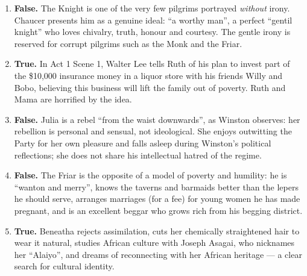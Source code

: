 \documentclass[11pt]{article}
\begin{document}
\begin{corrige}
\begin{enumerate}
\item \textbf{False.} The Knight is one of the very few pilgrims portrayed \emph{without} irony. Chaucer presents him as a genuine ideal: ``a worthy man'', a perfect ``gentil knight'' who loves chivalry, truth, honour and courtesy. The gentle irony is reserved for corrupt pilgrims such as the Monk and the Friar.
\item \textbf{True.} In Act 1 Scene 1, Walter Lee tells Ruth of his plan to invest part of the \$10,000 insurance money in a liquor store with his friends Willy and Bobo, believing this business will lift the family out of poverty. Ruth and Mama are horrified by the idea.
\item \textbf{False.} Julia is a rebel ``from the waist downwards'', as Winston observes: her rebellion is personal and sensual, not ideological. She enjoys outwitting the Party for her own pleasure and falls asleep during Winston's political reflections; she does not share his intellectual hatred of the regime.
\item \textbf{False.} The Friar is the opposite of a model of poverty and humility: he is ``wanton and merry'', knows the taverns and barmaids better than the lepers he should serve, arranges marriages (for a fee) for young women he has made pregnant, and is an excellent beggar who grows rich from his begging district.
\item \textbf{True.} Beneatha rejects assimilation, cuts her chemically straightened hair to wear it natural, studies African culture with Joseph Asagai, who nicknames her ``Alaiyo'', and dreams of reconnecting with her African heritage — a clear search for cultural identity.
\end{enumerate}
\end{corrige}
\end{document}
